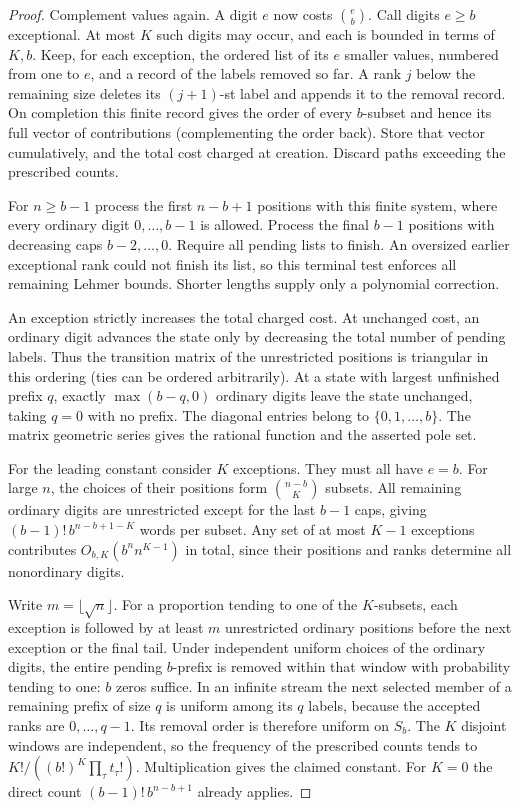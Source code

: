 \documentclass[11pt,letterpaper]{article}
\begin{document}
\begin{proof}
Complement values again. A digit $e$ now costs $\binom eb$. Call digits $e\ge b$ exceptional. At most $K$ such digits may occur, and each is bounded in terms of $K,b$. Keep, for each exception, the ordered list of its $e$ smaller values, numbered from one to $e$, and a record of the labels removed so far. A rank $j$ below the remaining size deletes its $(j+1)$-st label and appends it to the removal record. On completion this finite record gives the order of every $b$-subset and hence its full vector of contributions (complementing the order back). Store that vector cumulatively, and the total cost charged at creation. Discard paths exceeding the prescribed counts.

For $n\ge b-1$ process the first $n-b+1$ positions with this finite system, where every ordinary digit $0,\ldots,b-1$ is allowed. Process the final $b-1$ positions with decreasing caps $b-2,\ldots,0$. Require all pending lists to finish. An oversized earlier exceptional rank could not finish its list, so this terminal test enforces all remaining Lehmer bounds. Shorter lengths supply only a polynomial correction.

An exception strictly increases the total charged cost. At unchanged cost, an ordinary digit advances the state only by decreasing the total number of pending labels. Thus the transition matrix of the unrestricted positions is triangular in this ordering (ties can be ordered arbitrarily). At a state with largest unfinished prefix $q$, exactly $\max(b-q,0)$ ordinary digits leave the state unchanged, taking $q=0$ with no prefix. The diagonal entries belong to $\{0,1,\ldots,b\}$. The matrix geometric series gives the rational function and the asserted pole set.

For the leading constant consider $K$ exceptions. They must all have $e=b$. For large $n$, the choices of their positions form $\binom{n-b}{K}$ subsets. All remaining ordinary digits are unrestricted except for the last $b-1$ caps, giving $(b-1)!\,b^{n-b+1-K}$ words per subset. Any set of at most $K-1$ exceptions contributes $O_{b,K}(b^n n^{K-1})$ in total, since their positions and ranks determine all nonordinary digits.

Write $m=\lfloor\sqrt n\rfloor$. For a proportion tending to one of the $K$-subsets, each exception is followed by at least $m$ unrestricted ordinary positions before the next exception or the final tail. Under independent uniform choices of the ordinary digits, the entire pending $b$-prefix is removed within that window with probability tending to one: $b$ zeros suffice. In an infinite stream the next selected member of a remaining prefix of size $q$ is uniform among its $q$ labels, because the accepted ranks are $0,\ldots,q-1$. Its removal order is therefore uniform on $S_b$. The $K$ disjoint windows are independent, so the frequency of the prescribed counts tends to $K!/((b!)^K\prod_\tau t_\tau!)$. Multiplication gives the claimed constant. For $K=0$ the direct count $(b-1)!\,b^{n-b+1}$ already applies.
\end{proof}
\end{document}
